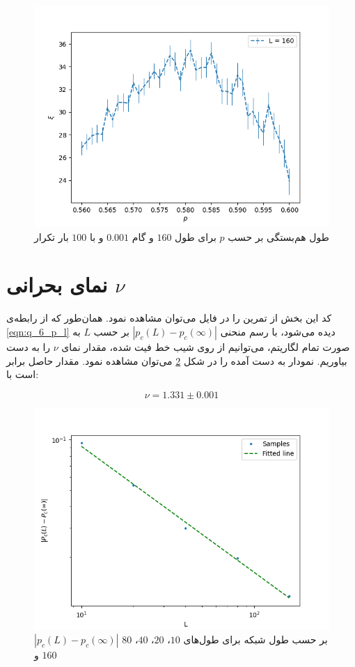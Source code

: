 \documentclass[11pt, a4paper]{article}
\begin{document}
\begin{figure}[h]
\begin{minipage}[b]{0.48\textwidth}
    \includegraphics[width=\textwidth]{q5_0.56_0.001_0.6_100_(160,)}
    \caption{طول هم‌بستگی بر حسب $p$ برای طول $160$ و گام $0.001$ و با $100$ بار تکرار}
    \label{fig:q5_160}
  \end{minipage}
\end{figure}


\section{\textbf{نمای بحرانی $\nu$}}
کد این بخش از تمرین را در فایل
می‌توان مشاهده نمود.
همان‌طور که از رابطه‌ی
\eqref{eqn:q_6_p_l}
دیده می‌شود، با رسم منحنی‌
$|p_c(L) - p_c(\infty)|$
بر حسب
$L$
به صورت تمام لگاریتم، می‌توانیم از روی شیب خط فیت شده، مقدار نمای
$\nu$
را به دست بیاوریم. نمودار به دست آمده را در شکل
\ref{fig:q6_nu}
می‌توان مشاهده نمود. مقدار حاصل برابر است با:

\begin{equation}
  \nu = 1.331 \pm 0.001
\end{equation}

\begin{figure}[h]
  \centering
  \includegraphics[width=.7\textwidth]{q6_[10, 20, 40, 80, 160]_width.png}
  \caption{$|p_c(L) - p_c(\infty)|$ بر حسب طول شبکه برای طول‌های $10$، $20$، $40$، $80$ و $160$}
  \label{fig:q6_nu}
\end{figure}
\end{document}
